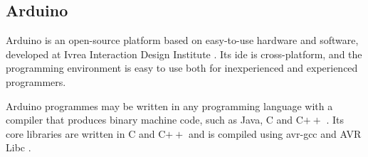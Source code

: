 \subsection{Arduino}
\label{sec:progplatarduino}
Arduino is an open-source platform based on easy-to-use hardware and software, developed at Ivrea Interaction Design Institute  \cite{arduino2}. Its \acrfull{ide} is cross-platform, and the programming environment is easy to use both for inexperienced and experienced programmers.

Arduino programmes may be written in any programming language with a compiler that produces binary machine code, such as Java, C and C$++$ \cite{arduino}. Its core libraries are written in C and C$++$ and is compiled using avr-gcc and AVR Libc \cite{arduinobuild}.